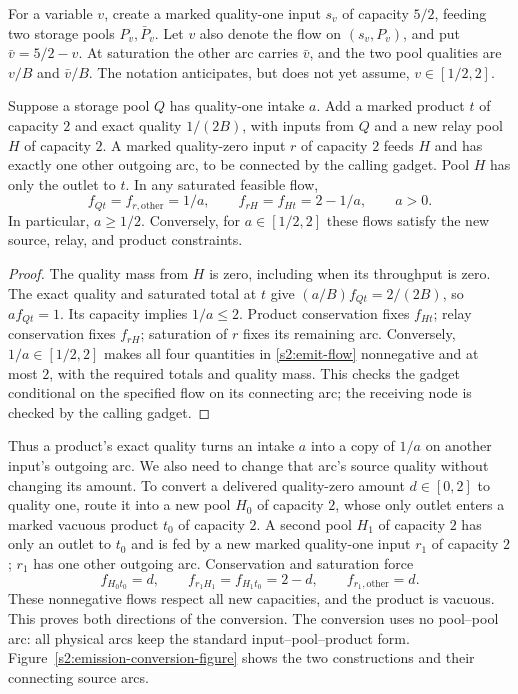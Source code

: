 For a variable $v$, create a marked quality-one input $s_v$ of capacity
$5/2$, feeding two storage pools $P_v,\bar P_v$. Let $v$ also denote
the flow on $(s_v,P_v)$, and put $\bar v=5/2-v$. At saturation the
other arc carries $\bar v$, and the two pool qualities are $v/B$ and
$\bar v/B$. The notation anticipates, but does not yet assume,
$v\in[1/2,2]$.

\begin{lemma}\label{s2:emission}
Suppose a storage pool $Q$ has quality-one intake $a$. Add a marked
product $t$ of capacity $2$ and exact quality $1/(2B)$, with inputs
from $Q$ and a new relay pool $H$ of capacity $2$. A marked quality-zero
input $r$ of capacity $2$ feeds $H$ and has exactly one other outgoing
arc, to be connected by the calling gadget. Pool $H$ has only the outlet
to $t$. In any saturated feasible flow,
\begin{equation}
 f_{Qt}=f_{r,\mathrm{other}}=1/a,\qquad
 f_{rH}=f_{Ht}=2-1/a,\qquad a>0.\label{s2:emit-flow}
\end{equation}
In particular, $a\ge1/2$. Conversely, for $a\in[1/2,2]$ these flows
satisfy the new source, relay, and product constraints.
\end{lemma}
\begin{proof}
The quality mass from $H$ is zero, including when its throughput is zero.
The exact quality and saturated total at $t$ give
$(a/B)f_{Qt}=2/(2B)$, so $af_{Qt}=1$.
Its capacity implies $1/a\le2$. Product conservation fixes $f_{Ht}$;
relay conservation fixes $f_{rH}$; saturation of $r$ fixes its remaining
arc. Conversely, $1/a\in[1/2,2]$ makes all four quantities in
\eqref{s2:emit-flow} nonnegative and at most $2$, with the required
totals and quality mass. This checks the gadget conditional on the
specified flow on its connecting arc; the receiving node is checked
by the calling gadget.
\end{proof}

Thus a product's exact quality turns an intake $a$ into a copy of $1/a$
on another input's outgoing arc. We also need to change that arc's source
quality without changing its amount. To convert a delivered quality-zero
amount $d\in[0,2]$ to quality one, route it into a new pool $H_0$ of
capacity $2$, whose only outlet enters a marked vacuous product $t_0$
of capacity $2$. A second pool $H_1$ of capacity $2$ has only an outlet
to $t_0$ and is fed by a new marked quality-one input $r_1$ of capacity
$2$; $r_1$ has one other outgoing arc. Conservation and saturation force
\begin{equation}
 f_{H_0t_0}=d,\qquad f_{r_1H_1}=f_{H_1t_0}=2-d,
 \qquad f_{r_1,\mathrm{other}}=d.\label{s2:flip}
\end{equation}
These nonnegative flows respect all new capacities, and the product is
vacuous. This proves both directions of the conversion. The conversion
uses no pool--pool arc: all physical arcs keep the standard
input--pool--product form. Figure~\ref{s2:emission-conversion-figure}
shows the two constructions and their connecting source arcs.

